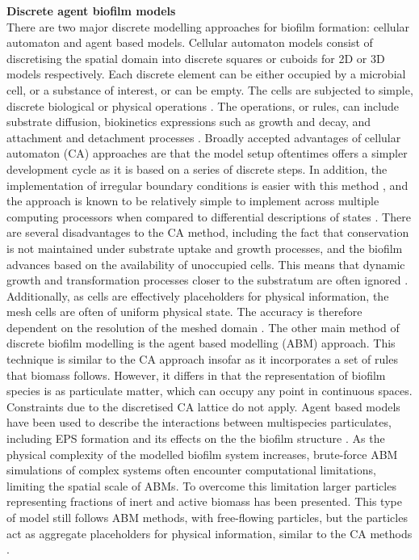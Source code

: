 \textbf{Discrete agent biofilm models}\\
There are two major discrete modelling approaches for biofilm formation: cellular automaton and agent based models. Cellular automaton models consist of discretising the spatial domain into discrete squares or cuboids for 2D or 3D models respectively. Each discrete element can be either occupied by a microbial cell, or a substance of interest, or can be empty. The cells are subjected to simple, discrete biological or physical operations \cite{dacunto2017}. The operations, or rules, can include substrate diffusion, biokinetics expressions such as growth and decay, and attachment and detachment processes \cite{skoneczny2015}. Broadly accepted advantages of cellular automaton (CA) approaches are that the model setup oftentimes offers a simpler  development cycle as it is based on a series of discrete steps. In addition, the implementation of irregular boundary conditions is easier with this method \cite{pizzaro2001}, and the approach is known to be relatively simple to implement across multiple computing processors when compared to differential descriptions of states \cite{toffoli1987} . There are several disadvantages to the CA method, including the fact that conservation is not maintained under substrate uptake and growth processes, and the biofilm advances based on the availability of unoccupied cells. This means that dynamic growth and transformation processes closer to the substratum are often ignored \cite{dacunto2017}. Additionally, as cells are effectively placeholders for physical information, the mesh cells are often of uniform physical state. The accuracy is therefore dependent on the resolution of the meshed domain \cite{dacunto2017}.
\skippingparagraph
The other main method of discrete biofilm modelling is the agent based modelling (ABM) approach. This technique is similar to the CA approach insofar as it incorporates a set of rules that biomass follows. However, it differs in that the representation of biofilm species is as particulate matter, which can occupy any point in continuous spaces. Constraints due to the discretised CA lattice do not apply. Agent based models have been used to describe the interactions between multispecies particulates, including EPS formation and its effects on the the biofilm structure \cite{xavier2005a}. As the physical complexity of the modelled biofilm system increases, brute-force ABM simulations of complex systems often encounter computational limitations, limiting the spatial scale of ABMs. To overcome this limitation larger particles representing fractions of inert and active biomass has been presented. This type of model still follows ABM methods, with free-flowing particles, but the particles act as aggregate placeholders for physical information, similar to the CA methods \cite{picioreanu2004}.
